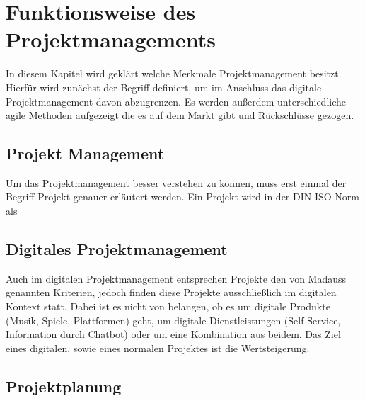 \chapter{Funktionsweise des Projektmanagements}


	In diesem Kapitel wird geklärt welche Merkmale Projektmanagement besitzt. Hierfür wird zunächst der Begriff  definiert, um im Anschluss das digitale Projektmanagement davon abzugrenzen. Es werden außerdem unterschiedliche agile Methoden aufgezeigt die es auf dem Markt gibt und Rückschlüsse gezogen. 

\section{Projekt Management}
\label{sec:projectMngmt}

	Um das Projektmanagement besser verstehen zu können, muss erst einmal der Begriff Projekt genauer erläutert werden. Ein Projekt wird in der DIN ISO Norm als 
	
	
	


\section{Digitales Projektmanagement}

Auch im digitalen Projektmanagement entsprechen Projekte den von Madauss genannten Kriterien, jedoch finden diese Projekte ausschließlich im digitalen Kontext statt. Dabei ist es nicht von belangen, ob es um digitale Produkte (Musik, Spiele, Plattformen) geht, um digitale Dienstleistungen (Self Service, Information durch Chatbot) oder um eine Kombination aus beidem. Das Ziel eines digitalen, sowie eines normalen Projektes ist die Wertsteigerung. 
\cite[S.33]{madauss2019}


\section{Projektplanung}

	